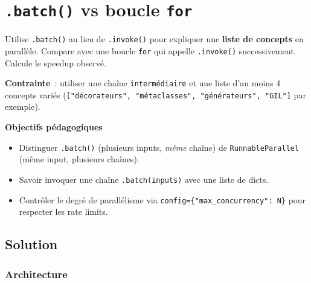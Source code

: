 \documentclass[11pt,a4paper]{article}
\begin{document}
\section{\texttt{.batch()} vs boucle \texttt{for}}

\begin{tcolorbox}[title=Exercice bonus 2. Paralléliser plusieurs \emph{inputs} sur la même chaîne]
Utilise \texttt{.batch()} au lieu de \texttt{.invoke()} pour expliquer
une \textbf{liste de concepts} en parallèle. Compare avec une boucle
\texttt{for} qui appelle \texttt{.invoke()} successivement. Calcule le
speedup observé.

\textbf{Contrainte}~: utiliser une chaîne \texttt{intermédiaire} et une
liste d'au moins 4 concepts variés (\texttt{["décorateurs", "métaclasses",
"générateurs", "GIL"]} par exemple).

\bigskip
\noindent\textbf{Objectifs pédagogiques}
\begin{itemize}[leftmargin=*]
  \item Distinguer \texttt{.batch()} (plusieurs inputs, \emph{même} chaîne)
        de \texttt{RunnableParallel} (même input, plusieurs chaînes).
  \item Savoir invoquer une chaîne \texttt{.batch(inputs)} avec une liste
        de dicts.
  \item Contrôler le degré de parallélisme via
        \texttt{config=\{"max\_concurrency": N\}} pour respecter les
        rate limits.
\end{itemize}
\end{tcolorbox}

\subsection{Solution}

\subsubsection{Architecture}
\end{document}
